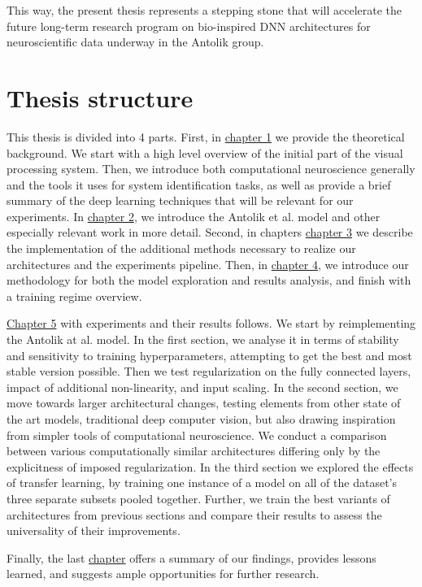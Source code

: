 This way, the present thesis represents a stepping stone that will accelerate the future long-term research program on bio-inspired DNN architectures for neuroscientific data underway in the Antolik group.

\section*{Thesis structure}
This thesis is divided into 4 parts. First, in \hyperref[ch:1]{chapter 1} we provide the theoretical background. We start with a high level overview of the initial part of the visual processing system. Then, we introduce both computational neuroscience generally and the tools it uses for system identification tasks, as well as provide a brief summary of the deep learning techniques that will be relevant for our experiments. In \hyperref[ch:2]{chapter 2}, we introduce the Antolik et al. model and other especially relevant work in more detail. Second, in chapters \hyperref[ch:3]{chapter 3} we describe the implementation of the additional methods necessary to realize our architectures and the experiments pipeline. Then, in \hyperref[ch:4]{chapter 4}, we introduce our methodology for both the model exploration and results analysis, and finish with a training regime overview.

\hyperref[ch:5]{Chapter 5} with experiments and their results follows. We start by reimplementing the Antolik at al. model. In the first section, we analyse it in terms of stability and sensitivity to training hyperparameters, attempting to get the best and most stable version possible. Then we test regularization on the fully connected layers, impact of additional non-linearity, and input scaling. In the second section, we move towards larger architectural changes, testing elements from other state of the art models, traditional deep computer vision, but also drawing inspiration from simpler tools of computational neuroscience. We conduct a comparison between various computationally similar architectures differing only by the explicitness of imposed regularization. In the third section we explored the effects of transfer learning, by training one instance of a model on all of the dataset’s three separate subsets pooled together. Further, we train the best variants of architectures from previous sections and compare their results to assess the universality of their improvements.

Finally, the last \hyperref[ch:6]{chapter} offers a summary of our findings, provides lessons learned, and suggests ample opportunities for further research.